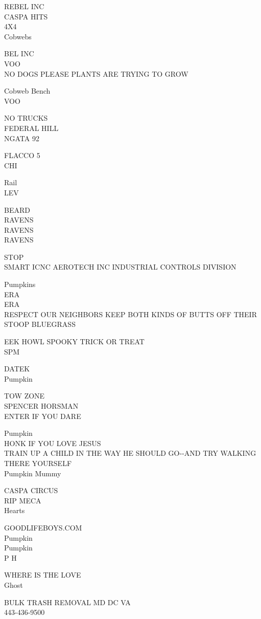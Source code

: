 \documentclass[10pt,letterpaper]{article}
\begin{document}
REBEL INC\\
CASPA HITS\\
4X4\\
Cobwebs

BEL INC\\
VOO\\
NO DOGS PLEASE PLANTS ARE TRYING TO GROW

Cobweb Bench\\
VOO

NO TRUCKS\\
FEDERAL HILL\\
NGATA 92

FLACCO 5\\
CHI

Rail\\
LEV

BEARD\\
RAVENS\\
RAVENS\\
RAVENS

STOP\\
SMART ICNC AEROTECH INC INDUSTRIAL CONTROLS DIVISION

Pumpkins\\
ERA\\
ERA\\
RESPECT OUR NEIGHBORS KEEP BOTH KINDS OF BUTTS OFF THEIR STOOP BLUEGRASS

EEK HOWL SPOOKY TRICK OR TREAT\\
SPM

DATEK\\
Pumpkin

TOW ZONE\\
SPENCER HORSMAN\\
ENTER IF YOU DARE

Pumpkin\\
HONK IF YOU LOVE JESUS\\
TRAIN UP A CHILD IN THE WAY HE SHOULD GO{-}{-}AND TRY WALKING THERE YOURSELF\\
Pumpkin Mummy

CASPA CIRCUS\\
RIP MECA\\
Hearts

GOODLIFEBOYS.COM\\
Pumpkin\\
Pumpkin\\
P H

WHERE IS THE LOVE\\
Ghost

BULK TRASH REMOVAL MD DC VA\\
443{-}436{-}9500
\end{document}

